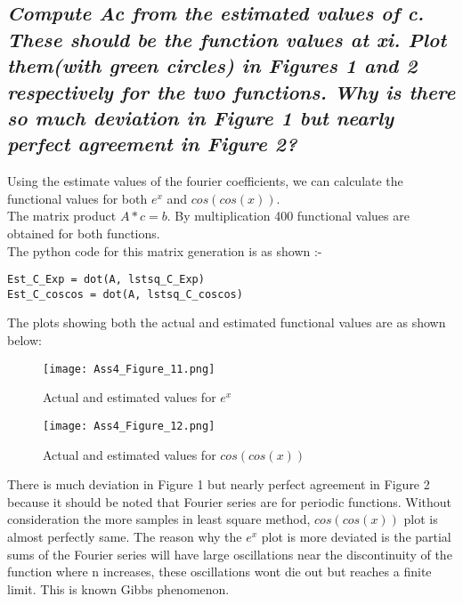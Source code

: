 \documentclass[11pt, a4paper]{article}
\begin{document}
\subsection*{\textsl{Compute Ac from the estimated values of c.  These should be the function values at xi. Plot them(with green circles) in Figures 1 and 2 respectively for the two functions.  Why is there so much deviation in Figure 1 but nearly perfect agreement in Figure 2?}}
Using the estimate values of the fourier coefficients, we can calculate the functional values for both $e^{x}$ and $cos(cos(x))$. \\
The matrix product $A*c=b$. By multiplication 400 functional values are obtained for both functions.\\
The python code for this matrix generation is as shown :-
\begin{verbatim}
Est_C_Exp = dot(A, lstsq_C_Exp) 
Est_C_coscos = dot(A, lstsq_C_coscos)
\end{verbatim}
The plots showing both the actual and estimated functional values are as shown below:

 	\begin{figure}[!tbh]
   	\centering
   	\texttt{[image: Ass4\_Figure\_11.png]}   
   	\caption{Actual and estimated values for $e^{x}$}
   	\label{fig:sample}
   \end{figure} 
   
   \begin{figure}[!tbh]
   	\centering
   	\texttt{[image: Ass4\_Figure\_12.png]}   
   	\caption{Actual and estimated values for $cos(cos(x))$}
   	\label{fig:sample}
   \end{figure}
   \cleardoublepage
   There is much deviation in Figure 1 but nearly perfect agreement in Figure 2 because it should be noted that Fourier series are for periodic functions. Without consideration the more samples in least square method, $cos(cos(x))$ plot is almost perfectly same. The reason why the $e^x$ plot is more deviated is the partial sums of the Fourier series will have large oscillations near the discontinuity of the function where n increases, these oscillations wont die out but reaches a finite limit. This is known Gibbs phenomenon.
	
\end{document}
